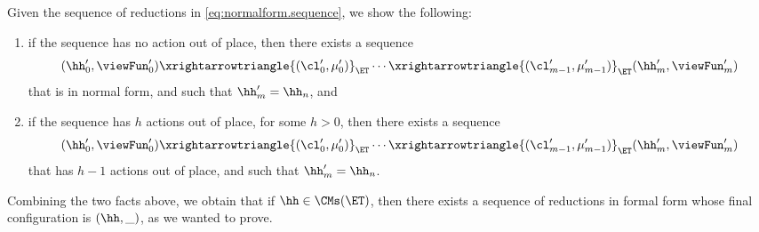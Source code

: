 Given the sequence of reductions in \cref{eq:normalform.sequence}, we show the following: 
\begin{enumerate}
\item if the sequence has no action out of place, then there exists a sequence 
\[
(\hh'_{0}, \viewFun'_{0}) \xrightarrowtriangle{(\cl'_{0}, \mu'_{0})}_{\ET} \cdots \xrightarrowtriangle{(\cl'_{m-1}, \mu'_{m-1})}_{\ET} (\hh'_{m}, \viewFun'_{m})
\]
that is in normal form, and such that $\hh'_{m} = \hh_{n}$, and 
\item if the sequence has $h$ actions out of place, for some $h > 0$, then there exists a sequence 
\[
(\hh'_{0}, \viewFun'_{0}) \xrightarrowtriangle{(\cl'_{0}, \mu'_{0})}_{\ET} \cdots \xrightarrowtriangle{(\cl'_{m-1}, \mu'_{m-1})}_{\ET} (\hh'_{m}, \viewFun'_{m})
\]
that has $h-1$ actions out of place, and such that $\hh'_{m} = \hh_{n}$.
\end{enumerate}
Combining the two facts above, we obtain that if $\hh \in \CMs(\ET)$, then there exists a sequence of reductions in formal form whose final 
configuration is $(\hh, \_)$, as we wanted to prove.


